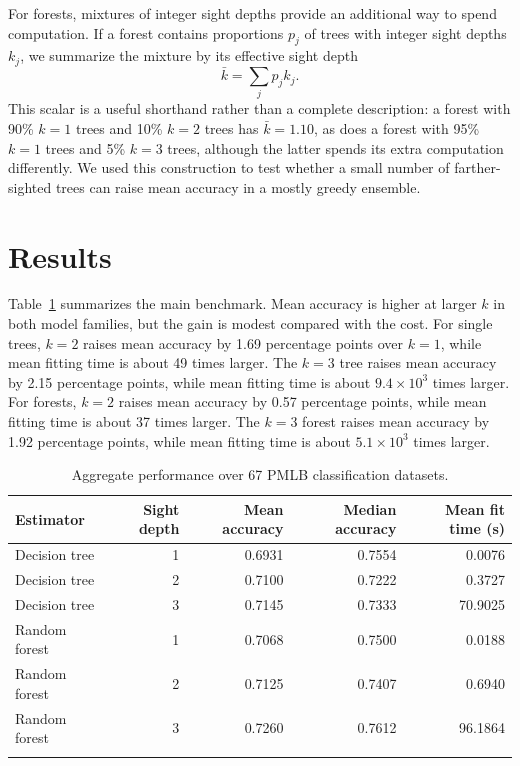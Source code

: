 \documentclass[pdflatex,sn-mathphys-num]{sn-jnl}
\begin{document}
For forests, mixtures of integer sight depths provide an additional way to spend computation. If a forest contains proportions $p_j$ of trees with integer sight depths $k_j$, we summarize the mixture by its effective sight depth
\[
\bar{k}=\sum_j p_j k_j .
\]
This scalar is a useful shorthand rather than a complete description: a forest with 90\% $k=1$ trees and 10\% $k=2$ trees has $\bar{k}=1.10$, as does a forest with 95\% $k=1$ trees and 5\% $k=3$ trees, although the latter spends its extra computation differently. We used this construction to test whether a small number of farther-sighted trees can raise mean accuracy in a mostly greedy ensemble.

\section{Results}\label{sec:results}

Table~\ref{tab:aggregate} summarizes the main benchmark. Mean accuracy is higher at larger $k$ in both model families, but the gain is modest compared with the cost. For single trees, $k=2$ raises mean accuracy by 1.69 percentage points over $k=1$, while mean fitting time is about 49 times larger. The $k=3$ tree raises mean accuracy by 2.15 percentage points, while mean fitting time is about $9.4\times 10^3$ times larger. For forests, $k=2$ raises mean accuracy by 0.57 percentage points, while mean fitting time is about 37 times larger. The $k=3$ forest raises mean accuracy by 1.92 percentage points, while mean fitting time is about $5.1\times 10^3$ times larger.

\begin{table}[t]
\caption{Aggregate performance over 67 PMLB classification datasets.}
\label{tab:aggregate}
\begin{tabular}{@{}lrrrr@{}}
\toprule
Estimator & Sight depth & Mean accuracy & Median accuracy & Mean fit time (s)\\
\midrule
Decision tree & 1 & 0.6931 & 0.7554 & 0.0076\\
Decision tree & 2 & 0.7100 & 0.7222 & 0.3727\\
Decision tree & 3 & 0.7145 & 0.7333 & 70.9025\\
Random forest & 1 & 0.7068 & 0.7500 & 0.0188\\
Random forest & 2 & 0.7125 & 0.7407 & 0.6940\\
Random forest & 3 & 0.7260 & 0.7612 & 96.1864\\
\botrule
\end{tabular}
\end{table}
\end{document}
